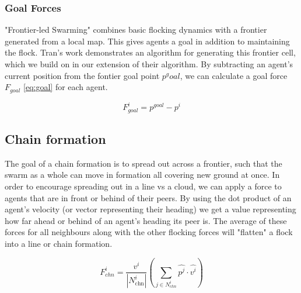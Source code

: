 \documentclass[runningheads]{llncs}
\begin{document}
\subsubsection{Goal Forces}
"Frontier-led Swarming" \cite{tran2022} combines basic flocking dynamics with a frontier generated from a local map.
This gives agents a goal in addition to maintaining the flock. 
Tran's work demonstrates an algorithm for generating this frontier cell, which we build on in our extension of their algorithm.
By subtracting an agent's current position from the fontier goal point $p^goal$, we can calculate a goal force $F_{goal}$ \ref{eq:goal} for each agent.

\begin{equation}
    F^i_{goal} = p^{goal} - p^i \label{eq:goal}
\end{equation}

\subsection{Chain formation}
The goal of a chain formation is to spread out across a frontier, such that the swarm as a whole can move in formation all covering new ground at once. In order to encourage spreading out in a line vs a cloud, we can apply a force to agents that are in front or behind of their peers. By using the dot product of an agent's velocity (or vector representing their heading) we get a value representing how far ahead or behind of an agent's heading its peer is. The average of these forces for all neighbours along with the other flocking forces will "flatten" a flock into a line or chain formation.

\begin{equation}
    F^i_{chn} = \frac{v^i}{|N^i_{\text{chn}}|} (\sum_{j \in N^i_{chn}} \hat{p^j} \cdot \hat{v^i})
\end{equation}




\end{document}
